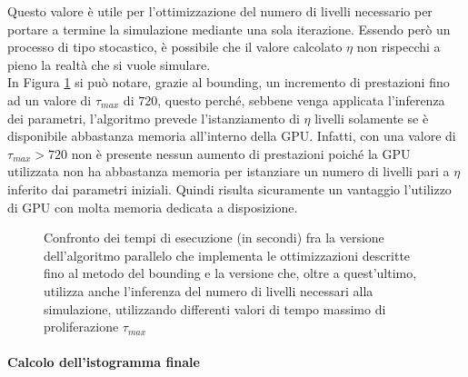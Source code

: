 Questo valore è utile per l'ottimizzazione del numero di livelli necessario
per portare a termine la simulazione mediante una sola iterazione.
Essendo però un processo di tipo stocastico, è possibile che il valore calcolato
$\eta$ non rispecchi a pieno la realtà che si vuole simulare.
\\
In Figura \ref{chart:bounding-inference} si può notare, grazie al bounding, un
incremento di prestazioni fino
ad un valore di $\tau_{max}$ di $720$, questo perché, sebbene venga applicata
l'inferenza dei parametri, l'algoritmo prevede l'istanziamento di $\eta$
livelli solamente se è disponibile abbastanza memoria all'interno della GPU.
Infatti, con una valore di $\tau_{max} > 720$ non è presente nessun aumento
di prestazioni poiché la GPU utilizzata non ha abbastanza memoria per istanziare
un numero di livelli pari a $\eta$ inferito dai parametri iniziali.
Quindi risulta sicuramente un vantaggio l'utilizzo di GPU con molta memoria
dedicata a disposizione.
\begin{figure}[H]
    \centering
    \caption{Confronto dei tempi di esecuzione (in secondi) fra la versione 
    dell'algoritmo
    parallelo che implementa le ottimizzazioni descritte fino al
    metodo del bounding
    e la versione che, oltre a quest'ultimo, utilizza anche l'inferenza del numero
    di livelli necessari alla simulazione,
    utilizzando differenti valori di tempo massimo di proliferazione
    $\tau_{max}$}
    \label{chart:bounding-inference}
\end{figure}

\paragraph{Calcolo dell'istogramma finale}\mbox{}

